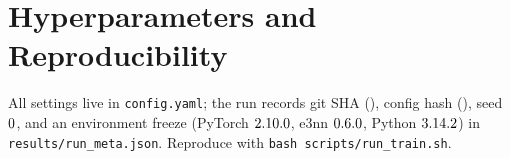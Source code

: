 \documentclass[11pt]{article}
\begin{document}
\section{Hyperparameters and Reproducibility}\label{sec:hparams}
All settings live in \texttt{config.yaml}; the run records git SHA
(\texttt{\gitSHA}), config hash (\texttt{\configHash}), seed $0$, and an
environment freeze (PyTorch $2.10.0$, e3nn $0.6.0$, Python $3.14.2$) in
\texttt{results/run\_meta.json}. Reproduce with \texttt{bash scripts/run\_train.sh}.



\end{document}
